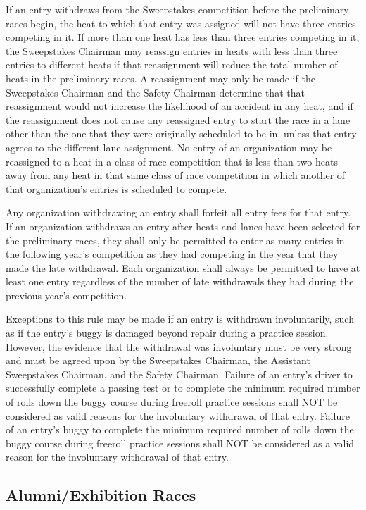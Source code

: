 	If an entry withdraws from the Sweepstakes competition before the preliminary races begin, the heat to which that entry was assigned will not have three entries competing in it. If more than one heat has less than three entries competing in it, the Sweepstakes Chairman may reassign entries in heats with less than three entries to different heats if that reassignment will reduce the total number of heats in the preliminary races. A reassignment may only be made if the Sweepstakes Chairman and the Safety Chairman determine that that reassignment would not increase the likelihood of an accident in any heat, and if the reassignment does not cause any reassigned entry to start the race in a lane other than the one that they were originally scheduled to be in, unless that entry agrees to the different lane assignment. No entry of an organization may be reassigned to a heat in a class of race competition that is less than two heats away from any heat in that same class of race competition in which another of that organization's entries is scheduled to compete.

	Any organization withdrawing an entry shall forfeit all entry fees for that entry. If an organization withdraws an entry after heats and lanes have been selected for the preliminary races, they shall only be permitted to enter as many entries in the following year's competition as they had competing in the year that they made the late withdrawal. Each organization shall always be permitted to have at least one entry regardless of the number of late withdrawals they had during the previous year's competition.

	Exceptions to this rule may be made if an entry is withdrawn involuntarily, such as if the entry's buggy is damaged beyond repair during a practice session. However, the evidence that the withdrawal was involuntary must be very strong and must be agreed upon by the Sweepstakes Chairman, the Assistant Sweepstakes Chairman, and the Safety Chairman. Failure of an entry's driver to successfully complete a passing test or to complete the minimum required number of rolls down the buggy course during freeroll practice sessions shall NOT be considered as valid reasons for the involuntary withdrawal of that entry. Failure of an entry's buggy to complete the minimum required number of rolls down the buggy course during freeroll practice sessions shall NOT be considered as a valid reason for the involuntary withdrawal of that entry.

\subsection{Alumni/Exhibition Races}

